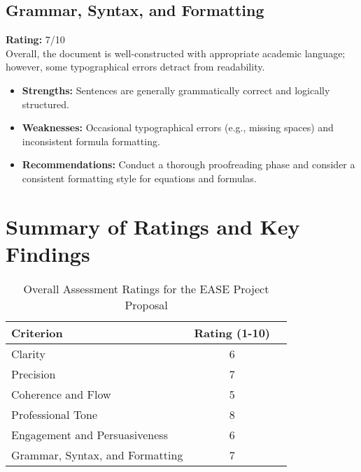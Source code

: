 \documentclass[11pt]{article}
\begin{document}
\subsection{Grammar, Syntax, and Formatting}
\textbf{Rating:} 7/10 \\
Overall, the document is well-constructed with appropriate academic language; however, some typographical errors detract from readability.
\begin{itemize}
    \item \textbf{Strengths:} Sentences are generally grammatically correct and logically structured.
    \item \textbf{Weaknesses:} Occasional typographical errors (e.g., missing spaces) and inconsistent formula formatting.
    \item \textbf{Recommendations:} Conduct a thorough proofreading phase and consider a consistent formatting style for equations and formulas.
\end{itemize}

\section{Summary of Ratings and Key Findings}

\begin{table}[h]
\centering
\begin{tabular}{@{}lcc@{}}
\toprule
\textbf{Criterion}         & \textbf{Rating (1-10)} \\ \midrule
Clarity                   & 6                       \\
Precision                 & 7                       \\
Coherence and Flow        & 5                       \\
Professional Tone         & 8                       \\
Engagement and Persuasiveness & 6                       \\
Grammar, Syntax, and Formatting & 7                       \\ \bottomrule
\end{tabular}
\caption{Overall Assessment Ratings for the EASE Project Proposal}
\label{tab:summary}
\end{table}
\end{document}

